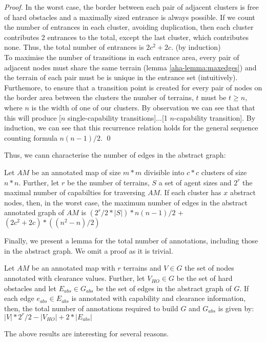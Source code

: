 \begin{proof}
In the worst case, the border between each pair of adjacent clusters is free of hard obstacles and a maximally sized entrance is always possible. If we count the number of entrances in each cluster, avoiding duplication, then each cluster contributes 2 entrances to the total, except the last cluster, which contributes none. Thus, the total number of entrances is $2c^2 + 2c$. (by induction) \\
To maximise the number of transitions in each entrance area, every pair of adjacent nodes must share the same terrain (lemma \ref{aha-lemma:maxedges}) and the terrain of each pair must be is unique in the entrance set (intuitively).
Furthemore, to ensure that a transition point is created for every pair of nodes on the border area between the clusters the number of terrains, $t$ must be $t \geq n$, where $n$ is the width of one of our clusters. By observation we can see that that this will produce [$n$ single-capability transitions]...[1 $n$-capability transition]. By induction, we can see that this recurrence relation holds for the general sequence counting formula $n(n-1)/2$. \qed
\end{proof}
Thus, we cann characterise the number of edges in the abstract graph:
\begin{lemma}
Let $AM$ be an annotated map of size $m*m$ divisible into $c*c$ clusters of size $n*n$. Further, let $r$ be the number of terrains, $S$ a set of agent sizes and $2^r$ the maximal number of capabilties for traversing $AM$. If each cluster has $x$ abstract nodes, then, in the worst case, the maximum number of edges in the abstract annotated graph of $AM$ is $(2^r/2 * |S|) * n(n-1)/2$ + $(2c^2 + 2c)*((n^2-n)/2)$
\end{lemma}
\medskip
Finally, we present a lemma for the total number of annotations, including those in the abstract graph. We omit a proof as it is trivial.
\begin{lemma}
\label{aha-lemma:totalannotations}
Let $AM$ be an annotated map with $r$ terrains and $V \in G$ the set of nodes annotated with clearance values. Further, let $V_{HO} \in G$ be the set of hard obstacles and let $E_{abs} \in G_{abs}$ be the set of edges in the abstract graph of $G$. If each edge $e_{abs} \in E_{abs}$ is annotated with capability and clearance information, then, the total number of annotations required to build $G$ and $G_{abs}$ is given by: 
$|V|*2^r/2 - |V_{HO}| + 2*|E_{abs}|$
\end{lemma}
\medskip
The above results are interesting for several reasons. 
